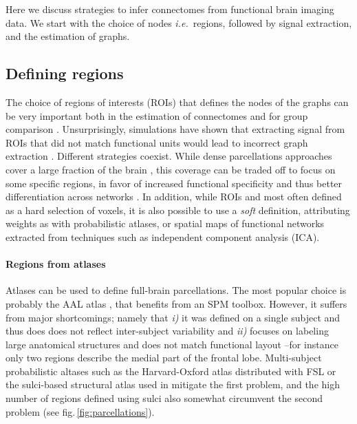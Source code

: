 \documentclass[5p]{elsarticle}
\begin{document}
Here we discuss strategies to infer connectomes from functional brain
imaging data. We start with the choice of nodes \emph{i.e.}\ regions,
followed by signal extraction, and the estimation of graphs.

\subsection{Defining regions}

The choice of regions of interests (ROIs) that defines the nodes of the
graphs can be very important both in the estimation of connectomes and
for group comparison \cite{wang2009}. Unsurprisingly, simulations have
shown that extracting signal from ROIs that did not match functional
units would lead to incorrect graph extraction \cite{smith2011}.
%
Different strategies coexist. While dense parcellations approaches cover
a large fraction of the brain \cite{achard2006, varoquaux2010c,
wang2009}, this coverage can be traded off to focus on some specific
regions, in favor of increased functional specificity and thus better
differentiation across networks \cite{greicius2003, fair2009,
varoquaux2010b, lewis2009, fransson2008, shirer2012}. In addition, while
ROIs and most often defined as a hard selection of voxels, it is also
possible to use a \emph{soft} definition, attributing weights as with
probabilistic atlases, or spatial maps of functional networks extracted
from techniques such as independent component analysis (ICA).


\paragraph{Regions from atlases}
%
Atlases can be used to define full-brain parcellations. The most popular
choice is probably the AAL atlas \cite{tzourio-mazoyer2002a}, that
benefits from an SPM toolbox. However, it suffers from major
shortcomings; namely that \emph{i)} it was defined on a single subject
and thus does does not reflect inter-subject variability and \emph{ii)}
focuses on labeling large anatomical structures and does not match
functional layout --for instance only two regions describe the medial
part of the frontal lobe. Multi-subject probabilistic altases such as the
Harvard-Oxford atlas distributed with FSL \cite{smith2004} or the
sulci-based structural atlas used in \cite{varoquaux2010c} mitigate the
first problem, and the high number of regions defined using sulci also
somewhat circumvent the second problem (see
fig.\,\ref{fig:parcellations}).
\end{document}

